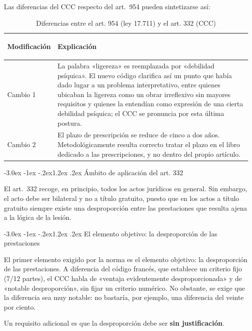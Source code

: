 \documentclass[12pt,oneside]{book}
\makeatletter
\renewcommand\section{\@startsection{section}{1}{\z@}%
  {-3.0ex \@plus -1ex \@minus -.2ex}{1.2ex \@plus .2ex}%
  {\normalfont\large\bfseries\color{acento}}}
\makeatother
\begin{document}
Las diferencias del CCC respecto del art.\ 954 pueden sintetizarse así:

\begin{table}[H]
\centering
\caption{Diferencias entre el art. 954 (ley 17.711) y el art. 332 (CCC)}
\begin{tabularx}{\textwidth}{>{\bfseries\raggedright\arraybackslash}p{} X}
\toprule
\textbf{Modificación} & \textbf{Explicación} \\
\midrule
Cambio 1 & La palabra «ligereza» es reemplazada por «debilidad psíquica». El nuevo código clarifica así un punto que había dado lugar a un problema interpretativo, entre quienes ubicaban la ligereza como un obrar irreflexivo sin mayores requisitos y quienes la entendían como expresión de una cierta debilidad psíquica; el CCC se pronuncia por esta última postura. \\
Cambio 2 & El plazo de prescripción se reduce de cinco a dos años. Metodológicamente resulta correcto tratar el plazo en el libro dedicado a las prescripciones, y no dentro del propio artículo. \\
\bottomrule
\end{tabularx}
\end{table}

\section{Ámbito de aplicación del art. 332}

El art.\ 332 recoge, en principio, todos los actos jurídicos en general. Sin embargo, el acto debe ser bilateral y no a título gratuito, puesto que en los actos a título gratuito siempre existe una desproporción entre las prestaciones que resulta ajena a la lógica de la lesión.

\section{El elemento objetivo: la desproporción de las prestaciones}

El primer elemento exigido por la norma es el elemento objetivo: la desproporción de las prestaciones. A diferencia del código francés, que establece un criterio fijo (7/12 partes), el CCC habla de «ventaja evidentemente desproporcionada» y de «notable desproporción», sin fijar un criterio numérico. No obstante, se exige que la diferencia sea muy notable: no bastaría, por ejemplo, una diferencia del veinte por ciento.

Un requisito adicional es que la desproporción debe ser \textbf{sin justificación}.
\end{document}
